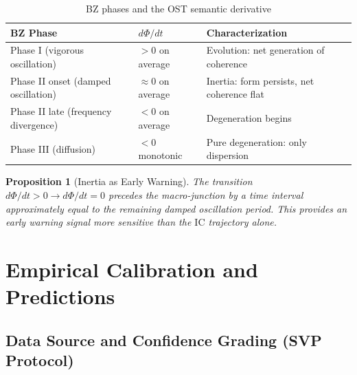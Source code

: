 \documentclass[12pt,a4paper]{article}
\newtheorem{proposition}{Proposition}[section]
\newcommand{\IC}{\mathrm{IC}}
\begin{document}
\begin{table}[H]
\centering
\caption{BZ phases and the OST semantic derivative}
\label{tab:semantic_derivative}
\begin{tabular}{@{}llp{5cm}@{}}
\toprule
\textbf{BZ Phase} & \textbf{$d\Phi/dt$} & \textbf{Characterization} \\
\midrule
Phase I (vigorous oscillation) & $> 0$ on average & Evolution: net generation of coherence \\
Phase II onset (damped oscillation) & $\approx 0$ on average & Inertia: form persists, net coherence flat \\
Phase II late (frequency divergence) & $< 0$ on average & Degeneration begins \\
Phase III (diffusion) & $< 0$ monotonic & Pure degeneration: only dispersion \\
\bottomrule
\end{tabular}
\end{table}

\begin{proposition}[Inertia as Early Warning]\label{prop:inertia}
The transition $d\Phi/dt > 0 \to d\Phi/dt = 0$ precedes the macro-junction by a time interval approximately equal to the remaining damped oscillation period. This provides an early warning signal more sensitive than the $\IC$ trajectory alone.
\end{proposition}


\section{Empirical Calibration and Predictions}\label{sec:predictions}

\subsection{Data Source and Confidence Grading (SVP Protocol)}
\end{document}
